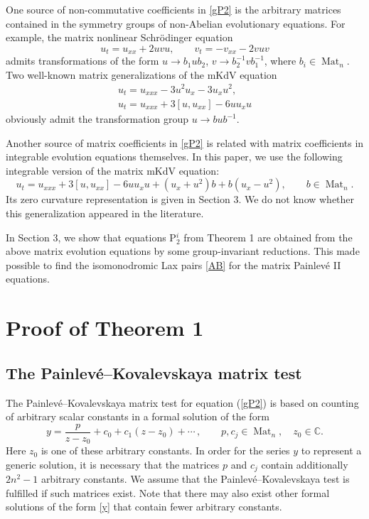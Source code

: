 \documentclass{article}
\theoremstyle{plain}
\theoremstyle{definition}
\DeclareMathOperator{\Mat}{Mat}
\begin{document}
One source of non-commutative coefficients in \eqref{gP2} is the arbitrary matrices contained in the symmetry groups of non-Abelian \cite{Marchenko_1986, OS_1998a} evolutionary equations. For example, the matrix nonlinear Schr\"odinger equation
\begin{equation}\label{NLS}
     u_t=u_{xx}+2uvu ,\qquad v_t= -v_{xx}-2vuv   
\end{equation}
admits transformations of the form $u\to b_1 u b_2$, $v\to b_2^{-1} v b_1^{-1}$, where $b_i\in\Mat_n.$ Two well-known matrix generalizations of the mKdV equation \cite{Marchenko_1986, Khalilov_Khruslov_1990}
\begin{gather*}
 u_t= u_{xxx}-3u^2u_x-3u_xu^2,\\[1.5mm]
 u_t= u_{xxx}+3[u,u_{xx}]-6uu_xu
\end{gather*}
obviously admit the transformation group $u \to b u b^{-1}.$

Another source of matrix coefficients in \eqref{gP2} is related with matrix coefficients in integrable evolution equations themselves. In this paper, we use the following integrable version of the matrix mKdV equation:
$$
 u_t= u_{xxx}+3[u, u_{xx}]-6u u_x u + (u_x+u^2) b + b (u_x-u^2), \qquad b\in\Mat_n.
$$
Its zero curvature representation is given in Section 3. We do not know whether this generalization appeared in the literature.

In Section 3, we show that equations P$_2^i$ from Theorem 1 are obtained from the above matrix evolution equations by some group-invariant reductions. This made possible to find the isomonodromic Lax pairs \eqref{AB} for the matrix Painlev\'e II equations.

\section{Proof of Theorem 1}\label{s:P2-test}
 
\subsection{The Painlev\'e--Kovalevskaya matrix test}

The Painlev\'e--Kovalevskaya matrix test \cite{Balandin_Sokolov_1998} for equation (\ref{gP2}) is based on counting of arbitrary scalar constants in a formal solution of the form
\begin{equation}\label{y}
 y=\frac{p}{z-z_0}+c_0+c_1(z-z_0)+\cdots\,, \qquad 
 p,c_j \in\Mat_n,\quad z_0\in{\mathbb C}.
\end{equation}
Here $z_0$ is one of these arbitrary constants. In order for the series $y$ to represent a generic solution, it is necessary that the matrices $p$ and $c_j$ contain additionally $2n^2-1$ arbitrary constants. We assume that the Painlev\'e--Kovalevskaya test is fulfilled if such matrices exist. Note that there may also exist other formal solutions of the form \eqref{y} that contain fewer arbitrary constants.
\end{document}
